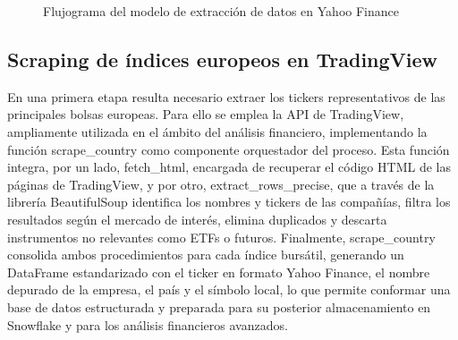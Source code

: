 \documentclass[letterpaper,10pt,spanish]{sphinxmanual}
\begin{document}
\begin{figure}[htbp]
\centering
\capstart

\noindent{}
\caption{ Flujograma del modelo de extracción de datos en Yahoo Finance}\label{\detokenize{DatosPreparacion:id4}}\end{figure}


\subsection{Scraping de índices europeos en TradingView}
\label{\detokenize{DatosPreparacion:scraping-de-indices-europeos-en-tradingview}}
\sphinxAtStartPar
En una primera etapa resulta necesario extraer los tickers representativos de las principales bolsas europeas. Para ello se emplea la API de TradingView, ampliamente utilizada en el ámbito del análisis financiero, implementando la función scrape\_country como componente orquestador del proceso. Esta función integra, por un lado, fetch\_html, encargada de recuperar el código HTML de las páginas de TradingView, y por otro, extract\_rows\_precise, que a través de la librería BeautifulSoup identifica los nombres y tickers de las compañías, filtra los resultados según el mercado de interés, elimina duplicados y descarta instrumentos no relevantes como ETFs o futuros. Finalmente, scrape\_country consolida ambos procedimientos para cada índice bursátil, generando un DataFrame estandarizado con el ticker en formato Yahoo Finance, el nombre depurado de la empresa, el país y el símbolo local, lo que permite conformar una base de datos estructurada y preparada para su posterior almacenamiento en Snowflake y para los análisis financieros avanzados.
\end{document}
